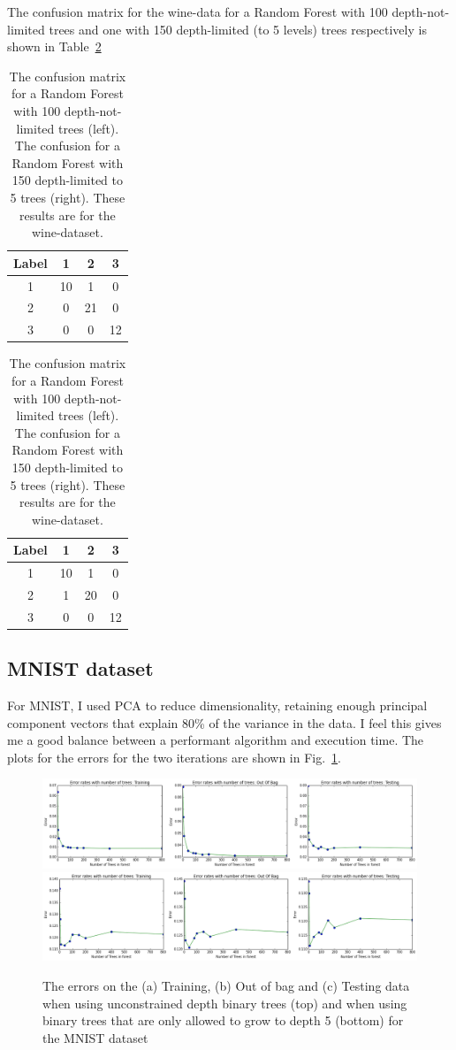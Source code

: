 \documentclass[5pt]{article}
\begin{document}
The confusion matrix for the wine-data for a Random Forest with 100
depth-not-limited trees and one with 150 depth-limited (to 5 levels) trees
respectively is shown
in Table~\ref{tab:confusionWine}

\begin{table}
\centering
\begin{tabular}{cccc}
\toprule
Label & 1 & 2 & 3\\
\midrule
  1 & 10 & 1 & 0\\
  2 & 0 & 21 & 0\\
  3 & 0 & 0 & 12\\
\bottomrule
\end{tabular}
\quad
\begin{tabular}{cccc}
\toprule
Label & 1 & 2 & 3 \\
\midrule
  1 & 10 & 1 & 0 \\
  2 & 1 & 20 & 0 \\
  3 & 0 & 0 & 12 \\
\bottomrule
\end{tabular}
\caption{The confusion matrix for a Random Forest with 100 depth-not-limited
  trees (left). The confusion for a Random Forest with 150 depth-limited to 5
trees (right). These results are for the wine-dataset.}
\label{tab:confusionWine}
\end{table}

\subsection{MNIST dataset}
For MNIST, I used PCA to reduce dimensionality, retaining enough principal
component vectors that explain 80\% of the variance in the data. I feel this
gives me a good balance between a performant algorithm and execution time. The
plots for the errors for the two iterations are shown in
Fig.~\ref{fig:errorsMNIST}.

\begin{figure}
  \includegraphics[width=\textwidth]{images/baggingDepthInfiniteMNIST.png}
  \includegraphics[width=\textwidth]{images/baggingDepthLimitedMNIST.png}
\label{fig:errorsMNIST}
\caption{The errors on the (a) Training, (b) Out of bag and (c) Testing data
  when using unconstrained depth binary trees (top) and when using binary trees
  that are only allowed to grow to depth 5 (bottom) for the MNIST dataset}
\end{figure}
\end{document}
